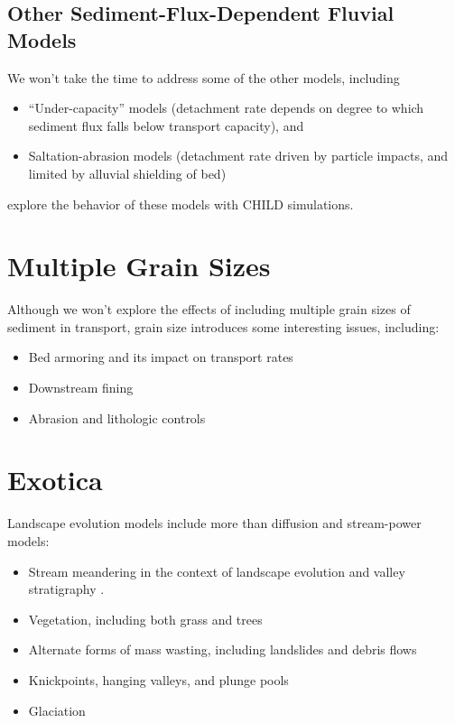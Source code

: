 \documentclass[12pt,reqno]{amsart}
\begin{document}
\subsection{Other Sediment-Flux-Dependent Fluvial Models}

We won't take the time to address some of the other models, including
\begin{itemize}
\item ``Under-capacity'' models (detachment rate depends on degree to
  which sediment flux falls below transport capacity), and
\item Saltation-abrasion models (detachment rate driven by particle impacts, and limited by alluvial shielding of bed)
\end{itemize}

\citet{gasparini2007predictions} explore the behavior of these models with CHILD simulations.

\section{Multiple Grain Sizes}

Although we won't explore the effects of including multiple grain
sizes of sediment in transport, grain size introduces some interesting issues, including:
\begin{itemize}
\item Bed armoring and its impact on transport rates
\item Downstream fining
\item Abrasion and lithologic controls
\end{itemize}

\section{Exotica}

Landscape evolution models include more than diffusion and
stream-power models:
\begin{itemize}
\item Stream meandering in the context of landscape evolution and valley stratigraphy \citep[][a,b]{clevis2006simple}. \nocite{clevis2006geoarchaeological}
\item Vegetation, including both grass
  \citep{collins2004modeling,istanbulluoglu2005vegetation} and trees
  \citep{lancaster2003effects}
\item Alternate forms of mass wasting, including landslides and debris
  flows \citep{densmore1998landsliding,lancaster2003effects,istanbulluoglu2005implications}
\item Knickpoints, hanging valleys, and plunge pools \citep{flores2006development,crosby2007formation}
\item Glaciation \citep{herman2006fluvial,herman2007tectonomorphic,herman2008evolution}
\end{itemize}
\end{document}
